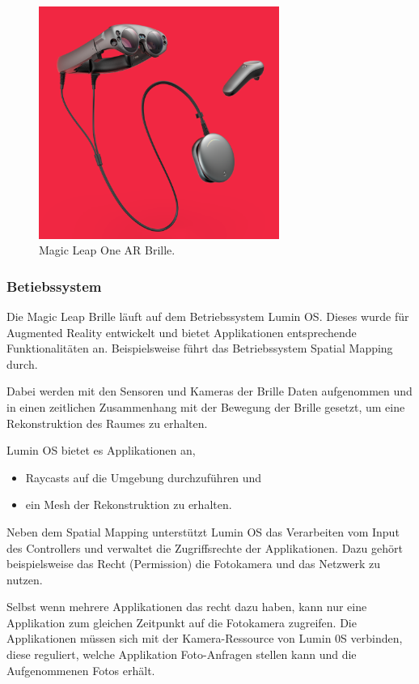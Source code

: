 \begin{figure}[H]
	\centering
	\includegraphics[width=0.7\textwidth]{images/img_magicLeap.PNG}
	\caption[]{Magic Leap One AR Brille.\citep{mlImage}}
	\label{viewManagement}
\end{figure}

\subsubsection{Betiebssystem}
Die Magic Leap Brille läuft auf dem Betriebssystem Lumin OS. Dieses wurde für Augmented Reality entwickelt und bietet Applikationen entsprechende Funktionalitäten an. Beispielsweise führt das Betriebssystem Spatial Mapping durch.\citep{mlluminOS,mlluminfeatures}

Dabei werden mit den Sensoren und Kameras der Brille Daten aufgenommen und in einen zeitlichen Zusammenhang mit der Bewegung der Brille gesetzt, um eine Rekonstruktion des Raumes zu erhalten.\citep{mlluminOS,mlluminfeatures,mlluminworldreconstruktion,mlmeshingunity}

Lumin OS bietet es Applikationen an,
\begin{itemize}
	\item Raycasts auf die Umgebung durchzuführen und
	\item ein Mesh der Rekonstruktion zu erhalten.
\end{itemize}
Neben dem Spatial Mapping unterstützt Lumin OS das Verarbeiten vom Input des Controllers und verwaltet die Zugriffsrechte der Applikationen. Dazu gehört beispielsweise das Recht (Permission) die Fotokamera und das Netzwerk zu nutzen.\citep{mlluminfeatures,mlappsecurity}

Selbst wenn mehrere Applikationen das recht dazu haben, kann nur eine Applikation zum gleichen Zeitpunkt auf die Fotokamera zugreifen. Die Applikationen müssen sich mit der Kamera-Ressource von Lumin 0S verbinden, diese reguliert, welche Applikation Foto-Anfragen stellen kann und die Aufgenommenen Fotos erhält. 


